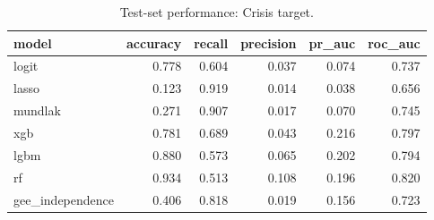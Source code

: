 \begin{table}
\caption{Test-set performance: Crisis target.}
\label{tab:test_metrics_crisis}
\begin{tabular}{lrrrrr}
\toprule
model & accuracy & recall & precision & pr_auc & roc_auc \\
\midrule
logit & 0.778 & 0.604 & 0.037 & 0.074 & 0.737 \\
lasso & 0.123 & 0.919 & 0.014 & 0.038 & 0.656 \\
mundlak & 0.271 & 0.907 & 0.017 & 0.070 & 0.745 \\
xgb & 0.781 & 0.689 & 0.043 & 0.216 & 0.797 \\
lgbm & 0.880 & 0.573 & 0.065 & 0.202 & 0.794 \\
rf & 0.934 & 0.513 & 0.108 & 0.196 & 0.820 \\
gee_independence & 0.406 & 0.818 & 0.019 & 0.156 & 0.723 \\
\bottomrule
\end{tabular}
\end{table}
